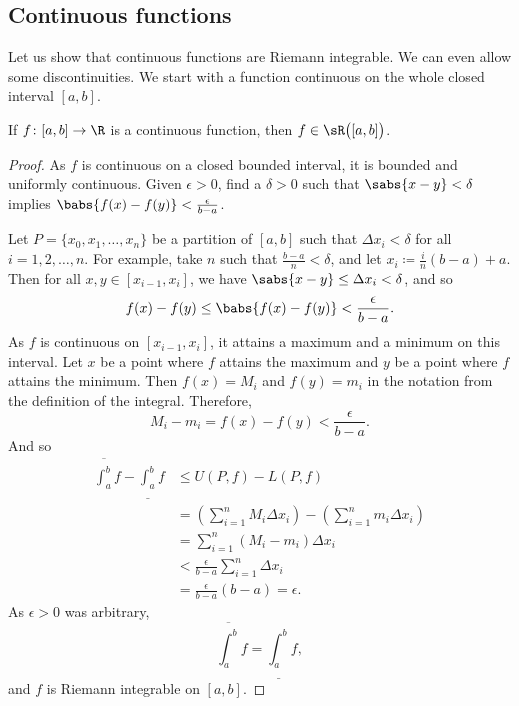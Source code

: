 \subsection{Continuous functions}

Let us show that continuous functions are Riemann integrable.
We can even allow some discontinuities.  We start with a
function continuous on the whole closed interval $[a,b]$.

\begin{lemma} \label{lemma:contint}
If $f \colon [a,b] \to \R$ is a continuous function,
then $f \in \sR\bigl([a,b]\bigr)$.
\end{lemma}

\begin{proof}
As $f$ is continuous on a closed bounded interval, it is
bounded and
uniformly continuous.
Given $\epsilon > 0$, find a $\delta > 0$ such that
$\sabs{x-y} < \delta$ implies $\babs{f(x)-f(y)} < \frac{\epsilon}{b-a}$.

Let $P = \{ x_0, x_1, \ldots, x_n \}$
be a partition of $[a,b]$ such that $\Delta x_i < \delta$ for all $i = 1,2,
\ldots, n$.  For example,
take $n$ such that $\frac{b-a}{n} < \delta$, and
let $x_i \coloneqq \frac{i}{n}(b-a) + a$.
Then for all $x, y \in [x_{i-1},x_i]$, we have 
$\sabs{x-y} \leq \Delta x_i < \delta$, and so
\begin{equation*}
f(x)-f(y) \leq \babs{f(x)-f(y)} < \frac{\epsilon}{b-a} .
\end{equation*}
As $f$ is continuous on $[x_{i-1},x_i]$, it attains a maximum and a minimum
on this interval.
Let $x$ be a point where $f$ attains the maximum and $y$ be a point
where $f$ attains the minimum.  Then $f(x) = M_i$
and $f(y) = m_i$ in the notation from the definition of the integral.
Therefore,
\begin{equation*}
M_i-m_i = f(x)-f(y) < 
\frac{\epsilon}{b-a} .
\end{equation*}
And so
\begin{equation*}
\begin{split}
\overline{\int_a^b} f - 
\underline{\int_a^b} f 
& \leq
U(P,f) - L(P,f)
\\
& =
\left(
\sum_{i=1}^n
M_i \Delta x_i
\right)
-
\left(
\sum_{i=1}^n
m_i \Delta x_i
\right)
\\
& =
\sum_{i=1}^n
(M_i-m_i) \Delta x_i
\\
& <
\frac{\epsilon}{b-a}
\sum_{i=1}^n
\Delta x_i
\\
& =
\frac{\epsilon}{b-a} (b-a)
= \epsilon .
\end{split}
\end{equation*}
As $\epsilon > 0$ was arbitrary,
\begin{equation*}
\overline{\int_a^b} f = \underline{\int_a^b} f ,
\end{equation*}
and $f$ is Riemann integrable on $[a,b]$.
\end{proof}



